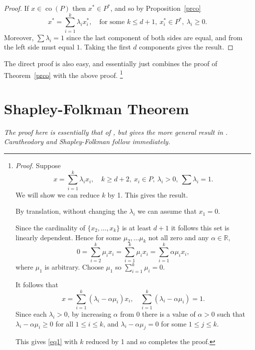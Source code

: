 \documentclass[a4paper]{amsart}
\theoremstyle{plain}
\theoremstyle{definition}
\theoremstyle{remark}
\DeclareMathOperator{\co}{co}
\begin{document}
\begin{proof}
If $ x \in \co (P) $ then $ x^* \in P^* $, and so by Proposition~\ref{prco}
\[
 x^* = \sum_{i=1}^k \lambda_i x^*_i ,\quad  \text{for some } k\leq d+1,\  x^*_i \in P^*, \  \lambda_i \geq 0   .
 \]
Moreover, $ \sum \lambda _i = 1 $ since the last component of both sides are equal, and from the left side must equal $ 1 $.
Taking the first $ d $ components gives the result.
\end{proof} 


The direct proof is also easy, and essentially just combines the proof of Theorem~\ref{prco} with the above proof.%
\footnote{\emph{Proof.} Suppose 
\[
x = \sum_{i=1}^k \lambda_i x_i ,\quad  k \geq d+2,\  x_i \in P, \  \lambda_i> 0,\ \sum \lambda_i = 1   .
\]
We will show we can reduce $ k $ by 1.  This gives the result.

By translation, without changing the $ \lambda_i $ we can  assume that $ x_1 = 0 $.  

Since the cardinality of $ \{x_2, \dots, x_k \} $ is at least $ d+1 $ it follows this set is linearly dependent. Hence for some $ \mu_2, \dots \mu_k $ not all zero and any $ \alpha \in \mathbb{R} $,  
\[
0 = \sum_{i=2}^k \mu_i x_i = \sum_{i=1}^k \mu_i x_i =  \sum_{i=1}^k \alpha \mu_i x_i,
\]
where $ \mu_1 $ is arbitrary.  Choose $ \mu_1 $ so $ \sum_{i=1}^k \mu_ i = 0 $.

It follows that 
\[
x =  \sum_{i=1}^k (\lambda_i - \alpha \mu_i ) x_i, \quad  \sum_{i=1}^k (\lambda_i - \alpha \mu_i ) = 1.
\]
Since each $ \lambda_i > 0 $, by increasing $ \alpha $ from $ 0 $ there is a value of $ \alpha > 0 $ such that 
$ \lambda_i - \alpha \mu_i \geq 0 $ for all $1\leq i \leq k $, and $ \lambda_i - \alpha \mu_j = 0 $ for some $1\leq j \leq k $.

This gives   \eqref{eq1} with $ k $ reduced by 1 and so completes the proof.
}



\section{\textbf{Shapley-Folkman Theorem}} \label{secSF}  
\noindent \emph{The proof here is essentially that of \cite{Zho}, but gives the more general result in 
\cite{And}.  Caratheodory and Shapley-Folkman follow immediately.}

\bigskip
\end{document}
